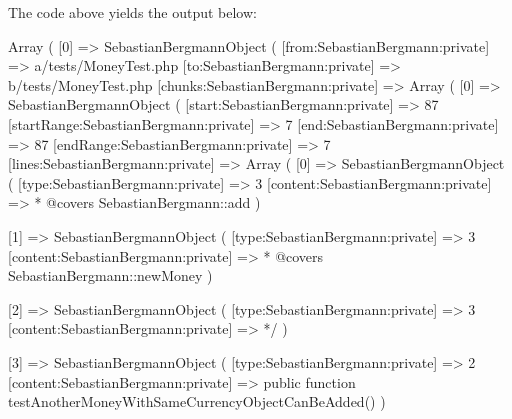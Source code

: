 The code above yields the output below\+: \begin{DoxyVerb}Array
(
    [0] => SebastianBergmann\Diff\Diff Object
        (
            [from:SebastianBergmann\Diff\Diff:private] => a/tests/MoneyTest.php
            [to:SebastianBergmann\Diff\Diff:private] => b/tests/MoneyTest.php
            [chunks:SebastianBergmann\Diff\Diff:private] => Array
                (
                    [0] => SebastianBergmann\Diff\Chunk Object
                        (
                            [start:SebastianBergmann\Diff\Chunk:private] => 87
                            [startRange:SebastianBergmann\Diff\Chunk:private] => 7
                            [end:SebastianBergmann\Diff\Chunk:private] => 87
                            [endRange:SebastianBergmann\Diff\Chunk:private] => 7
                            [lines:SebastianBergmann\Diff\Chunk:private] => Array
                                (
                                    [0] => SebastianBergmann\Diff\Line Object
                                        (
                                            [type:SebastianBergmann\Diff\Line:private] => 3
                                            [content:SebastianBergmann\Diff\Line:private] =>      * @covers SebastianBergmann\Money\Money::add
                                        )

                                    [1] => SebastianBergmann\Diff\Line Object
                                        (
                                            [type:SebastianBergmann\Diff\Line:private] => 3
                                            [content:SebastianBergmann\Diff\Line:private] =>      * @covers SebastianBergmann\Money\Money::newMoney
                                        )

                                    [2] => SebastianBergmann\Diff\Line Object
                                        (
                                            [type:SebastianBergmann\Diff\Line:private] => 3
                                            [content:SebastianBergmann\Diff\Line:private] =>      */
                                        )

                                    [3] => SebastianBergmann\Diff\Line Object
                                        (
                                            [type:SebastianBergmann\Diff\Line:private] => 2
                                            [content:SebastianBergmann\Diff\Line:private] =>     public function testAnotherMoneyWithSameCurrencyObjectCanBeAdded()
                                        )


\end{DoxyVerb}
